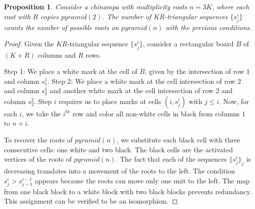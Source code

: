 \documentclass[a4paper]{article}\usepackage[english]{babel}
\newtheorem{proposition}[theorem]{Proposition}
\theoremstyle{definition}
\newcommand{\apyr}[1][l]{\ensuremath{pyramid(#1)}}
\begin{document}
\begin{proposition}\label{prop:geom}
Consider a chinampa with multiplicity roots $n=3K$, where each root with $R$ copies $\apyr[2]$. The number of $KR$-triangular sequences $\{s^i_j\}$ counts the number of possible roots on $\apyr[n]$ with the previous conditions.
\end{proposition}

\begin{proof}
Given the $KR$-triangular sequence $\{s_j^i\}$, consider a rectangular board $B$ of $(K+R)$ columns and $R$ rows.

Step 1: We place a white mark at the cell of $B$, given by the intersection of row 1 and column $s^1_1$. 
Step 2: We place a white mark at the cell intersection of row 2 and column $s^1_2$ and another white mark at the cell intersection of row 2 and column $s^2_2$. Step $i$ requires us to place marks at cells $(i,s_j^i)$ with $j\leq i$.  
Now, for each $i$, we take the $i^{th}$ row and color all non-white cells in black from columns $1$ to $n+i$. 

To recover the roots of $\apyr[n]$, we substitute each black cell with three consecutive cells: one white and two black. The black cells are the activated vertices of the roots of $\apyr[n]$. The fact that each of the sequences $\{s^i_j\}_j$ is decreasing translates into a movement of the roots to the left. The condition $s_{j}^i>s_{j-1}^{i-1}$ appears because the roots can move only one unit to the left. The map from one black block to a white block with two black blocks prevents redundancy.
This assignment can be verified to be an isomorphism.
\end{proof}
\end{document}
